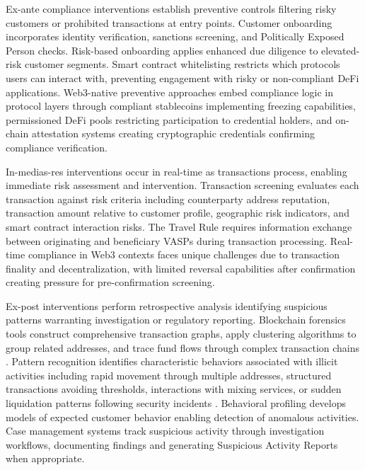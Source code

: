 \documentclass[conference,compsoc]{IEEEtran}
\begin{document}
Ex-ante compliance interventions establish preventive controls filtering risky customers or prohibited transactions at entry points. Customer onboarding incorporates identity verification, sanctions screening, and Politically Exposed Person checks. Risk-based onboarding applies enhanced due diligence to elevated-risk customer segments. Smart contract whitelisting restricts which protocols users can interact with, preventing engagement with risky or non-compliant DeFi applications. Web3-native preventive approaches embed compliance logic in protocol layers through compliant stablecoins implementing freezing capabilities, permissioned DeFi pools restricting participation to credential holders, and on-chain attestation systems creating cryptographic credentials confirming compliance verification.

In-medias-res interventions occur in real-time as transactions process, enabling immediate risk assessment and intervention. Transaction screening evaluates each transaction against risk criteria including counterparty address reputation, transaction amount relative to customer profile, geographic risk indicators, and smart contract interaction risks. The Travel Rule requires information exchange between originating and beneficiary VASPs during transaction processing. Real-time compliance in Web3 contexts faces unique challenges due to transaction finality and decentralization, with limited reversal capabilities after confirmation creating pressure for pre-confirmation screening.

Ex-post interventions perform retrospective analysis identifying suspicious patterns warranting investigation or regulatory reporting. Blockchain forensics tools construct comprehensive transaction graphs, apply clustering algorithms to group related addresses, and trace fund flows through complex transaction chains \cite{moser2013inquirymoneylaundering,yousaf2019tracingtransactionscryptocurrency,wu2023tracerscalablegraphbased}. Pattern recognition identifies characteristic behaviors associated with illicit activities including rapid movement through multiple addresses, structured transactions avoiding thresholds, interactions with mixing services, or sudden liquidation patterns following security incidents \cite{monamo2016unsupervisedlearningrobust,pourhabibi2020frauddetectionsystematic}. Behavioral profiling develops models of expected customer behavior enabling detection of anomalous activities. Case management systems track suspicious activity through investigation workflows, documenting findings and generating Suspicious Activity Reports when appropriate.
\end{document}
